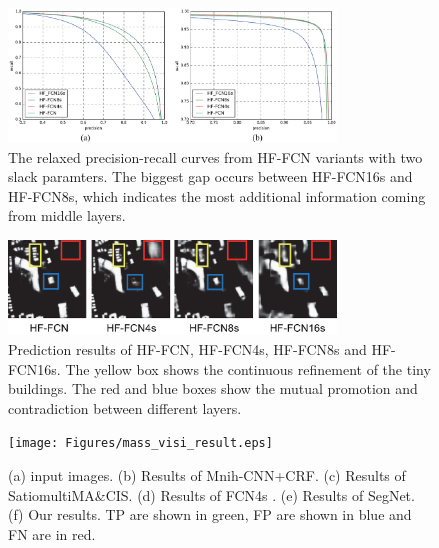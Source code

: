 \begin{figure}
\centering
\includegraphics[width=8.7cm]{Figures/HF-FCN-variant-PR.eps}
\caption{The relaxed precision-recall curves from HF-FCN variants with two slack paramters. The biggest gap occurs between HF-FCN16s and HF-FCN8s, which indicates the most additional information coming from middle layers.}
\label{8}
\end{figure}

\begin{figure}
\centering
\includegraphics[width=8.7cm]{Figures/HF-FCN_variants_result.eps}
\caption{Prediction results of HF-FCN, HF-FCN4s, HF-FCN8s and HF-FCN16s. The yellow box shows the continuous refinement of the tiny buildings. The red and blue boxes show the mutual promotion and contradiction between different layers.}
\label{9}
\end{figure}

\begin{figure}
\centering
\texttt{[image: Figures/mass\_visi\_result.eps]}
\caption{(a) input images. (b) Results of Mnih-CNN+CRF. (c) Results of Satio\-multi\-MA\&CIS. (d) Results of FCN4s . (e) Results of SegNet. (f) Our results. TP are shown in green, FP are shown in blue and FN are in red.}
\label{10}
\end{figure}

